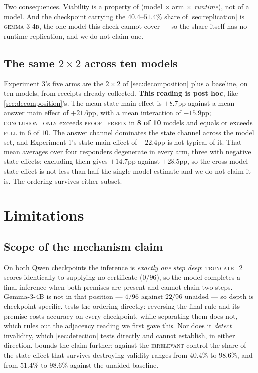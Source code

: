 \documentclass[10pt,twocolumn]{article}
\begin{document}
Two consequences. Viability is a property of (model $\times$ arm $\times$
\emph{runtime}), not of a model. And the checkpoint carrying the $40.4$--$51.4\%$
share of \cref{sec:replication} is \textsc{gemma-3-4b}, the one model this check
cannot cover --- so the share itself has no runtime replication, and we do not
claim one.

\subsection{The same \texorpdfstring{$2\times2$}{2x2} across ten models}

Experiment 3's five arms are the $2\times2$ of \cref{sec:decomposition} plus a
baseline, on ten models, from receipts already collected. \textbf{This reading is
post hoc}, like \cref{sec:decomposition}'s. The mean state main
effect is $+8.7$pp against a mean answer main effect of $+21.6$pp, with a mean
interaction of $-15.9$pp; \textsc{conclusion\_only} exceeds
\textsc{proof\_prefix} in \textbf{8 of 10} models and equals or exceeds
\textsc{full} in $6$ of $10$. The answer channel dominates the state channel across the model set, and
Experiment 1's state main effect of $+22.4$pp is not typical of it. That mean
averages over four responders degenerate in every arm, three with negative state
effects; excluding them gives $+14.7$pp against $+28.5$pp, so the cross-model
state effect is not less than half the single-model estimate and we do not claim
it is. The ordering survives either subset.

\section{Limitations}

\subsection{Scope of the mechanism claim}
\label{sec:mechanism}

On both Qwen checkpoints the inference is \emph{exactly one step deep}:
\textsc{truncate\_2} scores identically to supplying no certificate ($0/96$), so
the model completes a final inference when both premises are present and cannot
chain two steps. Gemma-3-4B is not in that position --- $4/96$ against $22/96$
unaided --- so depth is checkpoint-specific. 
tests the ordering directly: reversing the final rule and its premise costs
accuracy on every checkpoint, while separating them does not, which rules out
the adjacency reading we first gave this. Nor does it \emph{detect} invalidity, which
\cref{sec:detection} tests directly and cannot establish, in either direction.  bounds
the claim further: against the \textsc{irrelevant} control the share of the state effect that survives destroying validity ranges from $40.4\%$ to $98.6\%$, and from $51.4\%$ to
$98.6\%$ against the unaided baseline.
\end{document}
